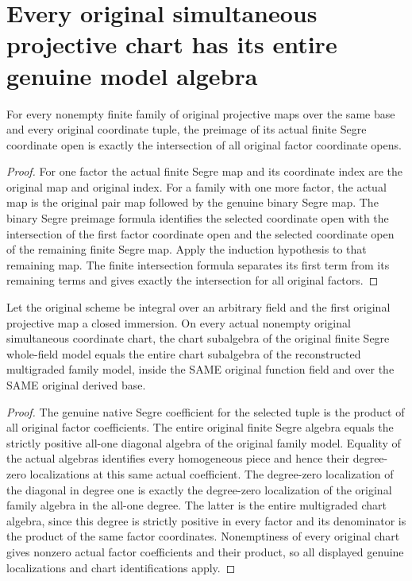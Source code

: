 \section{Every original simultaneous projective chart has its entire genuine model algebra}
\begin{lemma}\label{lem:original-finite-segre-chart-preimage}
\leanok
{}
For every nonempty finite family of original projective maps over the same base and every original coordinate tuple, the preimage of its actual finite Segre coordinate open is exactly the intersection of all original factor coordinate opens.
\end{lemma}
\begin{proof}
For one factor the actual finite Segre map and its coordinate index are the original map and original index. For a family with one more factor, the actual map is the original pair map followed by the genuine binary Segre map. The binary Segre preimage formula identifies the selected coordinate open with the intersection of the first factor coordinate open and the selected coordinate open of the remaining finite Segre map. Apply the induction hypothesis to that remaining map. The finite intersection formula separates its first term from its remaining terms and gives exactly the intersection for all original factors.
\end{proof}
\begin{theorem}\label{thm:actual-original-family-chart-algebra}
\leanok
{}
Let the original scheme be integral over an arbitrary field and the first original projective map a closed immersion. On every actual nonempty original simultaneous coordinate chart, the chart subalgebra of the original finite Segre whole-field model equals the entire chart subalgebra of the reconstructed multigraded family model, inside the SAME original function field and over the SAME original derived base.
\end{theorem}
\begin{proof}
The genuine native Segre coefficient for the selected tuple is the product of all original factor coefficients. The entire original finite Segre algebra equals the strictly positive all-one diagonal algebra of the original family model. Equality of the actual algebras identifies every homogeneous piece and hence their degree-zero localizations at this same actual coefficient. The degree-zero localization of the diagonal in degree one is exactly the degree-zero localization of the original family algebra in the all-one degree. The latter is the entire multigraded chart algebra, since this degree is strictly positive in every factor and its denominator is the product of the same factor coordinates. Nonemptiness of every original chart gives nonzero actual factor coefficients and their product, so all displayed genuine localizations and chart identifications apply.
\end{proof}
